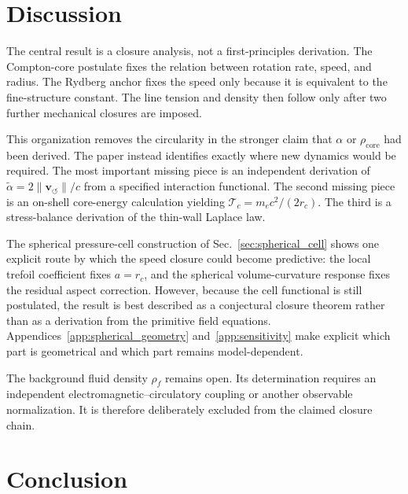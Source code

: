 \documentclass[aps,pra,preprint,longbibliography,nofootinbib]{revtex4-2}
\newcommand{\vnorm}{\lVert\mathbf{v}_{\!\boldsymbol{\circlearrowleft}}\rVert} %
\newcommand{\rhof}{\rho_{\!f}}                   %
\begin{document}
\section{Discussion}
\label{sec:discussion}

The central result is a closure analysis, not a first-principles
derivation.  The Compton-core postulate fixes the relation between
rotation rate, speed, and radius.  The Rydberg anchor fixes the speed
only because it is equivalent to the fine-structure constant.  The line
tension and density then follow only after two further mechanical
closures are imposed.

This organization removes the circularity in the stronger claim that
$\alpha$ or $\rho_{\mathrm{core}}$ had been derived.  The paper instead
identifies exactly where new dynamics would be required.  The most
important missing piece is an independent derivation of
$\tilde\alpha=2\vnorm/c$ from a specified interaction functional.  The
second missing piece is an on-shell core-energy calculation yielding
$\mathcal{T}_c=m_ec^2/(2r_c)$.  The third is a stress-balance derivation
of the thin-wall Laplace law.

The spherical pressure-cell construction of Sec.~\ref{sec:spherical_cell}
shows one explicit route by which the speed closure could become
predictive: the local trefoil coefficient fixes $a=r_c$, and the
spherical volume-curvature response fixes the residual aspect correction.
However, because the cell functional is still postulated, the result is
best described as a conjectural closure theorem rather than as a derivation
from the primitive field equations.  Appendices~\ref{app:spherical_geometry}
and~\ref{app:sensitivity} make explicit which part is geometrical and which
part remains model-dependent.

The background fluid density $\rhof$ remains open.  Its determination
requires an independent electromagnetic--circulatory coupling or another
observable normalization.  It is therefore deliberately excluded from
the claimed closure chain.

\section{Conclusion}
\label{sec:conclusion}
\end{document}
